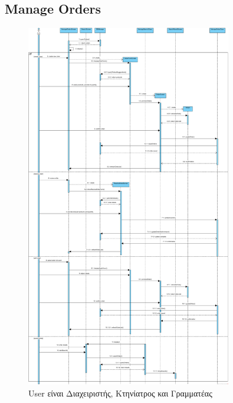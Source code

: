 \documentclass[12pt,a4paper,twoside]{book}
\begin{document}
\subsection{Manage Orders}
\begin{figure}[H]
    \centering
    \includegraphics[width=0.8\textwidth]{Resources/Sequence Diagram/manage_orders_sd.png}
    \caption{User είναι Διαχειριστής, Κτηνίατρος και Γραμματέας}\label{fig:sequence-manage-orders}
\end{figure}
\end{document}
